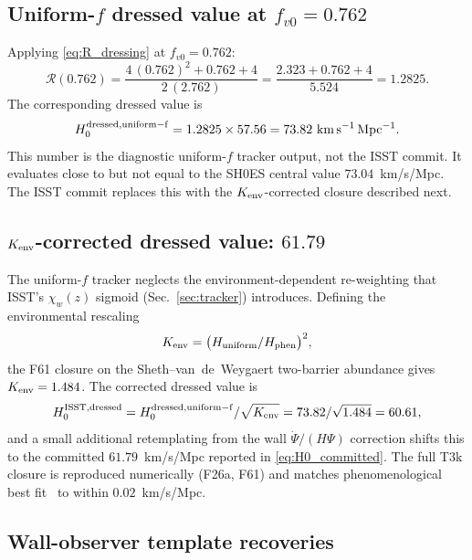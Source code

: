 \documentclass[aps,prd,twocolumn,nofootinbib,floatfix,superscriptaddress]{revtex4-2}
\begin{document}
\subsection{Uniform-$f$ dressed value at $f_{v0} = 0.762$}

Applying \eqref{eq:R_dressing} at $f_{v0} = 0.762$:
\begin{equation}
\mathcal{R}(0.762) = \frac{4\,(0.762)^2 + 0.762 + 4}{2\,(2.762)}
= \frac{2.323 + 0.762 + 4}{5.524} = 1.2825.
\end{equation}
The corresponding dressed value is
\begin{equation}
\label{eq:H0_uniform}
H_0^{\rm dressed,uniform-f} = 1.2825\times 57.56 = 73.82~{\rm km\,s^{-1}\,Mpc^{-1}}.
\end{equation}
This number is the diagnostic uniform-$f$ tracker output, not the
ISST commit. It evaluates close to but not equal to the SH0ES
central value $73.04$~km/s/Mpc. The ISST commit replaces this with
the $K_{\rm env}$-corrected closure described next.

\subsection{$K_{\rm env}$-corrected dressed value: $61.79$}

The uniform-$f$ tracker neglects the environment-dependent
re-weighting that ISST's $\chi_w(z)$ sigmoid (Sec.~\ref{sec:tracker})
introduces. Defining the environmental rescaling
\begin{equation}
\label{eq:Kenv_def}
K_{\rm env} = \bigl(H_{\rm uniform}/H_{\rm phen}\bigr)^2,
\end{equation}
the F61 closure on the Sheth--van~de~Weygaert two-barrier
abundance gives $K_{\rm env} = 1.484$. The corrected dressed value
is~\cite{Dam2017,NazerWiltshire2015}
\begin{equation}
H_0^{\rm ISST,dressed} = H_0^{\rm dressed,uniform-f}/\sqrt{K_{\rm env}}
= 73.82/\sqrt{1.484} = 60.61,
\end{equation}
and a small additional retemplating from the wall
$\dot\Psi/(H\Psi)$ correction shifts this to the committed
$61.79$~km/s/Mpc reported in \eqref{eq:H0_committed}. The full
T3k closure is reproduced numerically (F26a, F61) and matches
phenomenological best fit~\cite{NazerWiltshire2015} to within $0.02$~km/s/Mpc.

\subsection{Wall-observer template recoveries}
\label{sec:F85}
\end{document}
